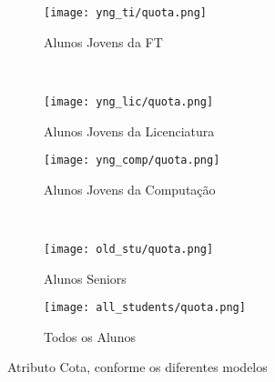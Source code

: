 \clearpage
\begin{figure}[!ht]
    \centering
    \begin{subfigure}[b]{0.48\textwidth}
        \centering
        \texttt{[image: yng\_ti/quota.png]}
        \caption{Alunos Jovens da FT}
    \end{subfigure}
    ~
    \begin{subfigure}[b]{0.48\textwidth}
        \centering
        \texttt{[image: yng\_lic/quota.png]}
        \caption{Alunos Jovens da Licenciatura}
    \end{subfigure}

    \begin{subfigure}[b]{0.48\textwidth}
        \centering
        \texttt{[image: yng\_comp/quota.png]}
        \caption{Alunos Jovens da Computação}
    \end{subfigure}
    ~
    \begin{subfigure}[b]{0.48\textwidth}
        \centering
        \texttt{[image: old\_stu/quota.png]}
        \caption{Alunos Seniors}
    \end{subfigure}

    \begin{subfigure}[b]{0.48\textwidth}
        \centering
        \texttt{[image: all\_students/quota.png]}
        \caption{Todos os Alunos}
    \end{subfigure}
    \caption{Atributo Cota, conforme os diferentes modelos}
\end{figure}

